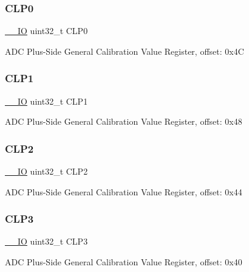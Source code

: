 \subsubsection{\texorpdfstring{CLP0}{CLP0}}
{\footnotesize\ttfamily \mbox{\hyperlink{core__cm0plus_8h_aec43007d9998a0a0e01faede4133d6be}{\+\_\+\+\_\+\+IO}} uint32\+\_\+t C\+L\+P0}

A\+DC Plus-\/\+Side General Calibration Value Register, offset\+: 0x4C \mbox{\label{struct_a_d_c___type_aa7869ef75cfd5cd705846e5ab901e275}} 
\subsubsection{\texorpdfstring{CLP1}{CLP1}}
{\footnotesize\ttfamily \mbox{\hyperlink{core__cm0plus_8h_aec43007d9998a0a0e01faede4133d6be}{\+\_\+\+\_\+\+IO}} uint32\+\_\+t C\+L\+P1}

A\+DC Plus-\/\+Side General Calibration Value Register, offset\+: 0x48 \mbox{\label{struct_a_d_c___type_a07deba1a9895548e459d751b6d4a9a9b}} 
\subsubsection{\texorpdfstring{CLP2}{CLP2}}
{\footnotesize\ttfamily \mbox{\hyperlink{core__cm0plus_8h_aec43007d9998a0a0e01faede4133d6be}{\+\_\+\+\_\+\+IO}} uint32\+\_\+t C\+L\+P2}

A\+DC Plus-\/\+Side General Calibration Value Register, offset\+: 0x44 \mbox{\label{struct_a_d_c___type_acc34fda0519e96304c90539eaa110979}} 
\subsubsection{\texorpdfstring{CLP3}{CLP3}}
{\footnotesize\ttfamily \mbox{\hyperlink{core__cm0plus_8h_aec43007d9998a0a0e01faede4133d6be}{\+\_\+\+\_\+\+IO}} uint32\+\_\+t C\+L\+P3}

A\+DC Plus-\/\+Side General Calibration Value Register, offset\+: 0x40 \mbox{\label{struct_a_d_c___type_af8205d2a8f6f433a429ad72e094d617e}} 
